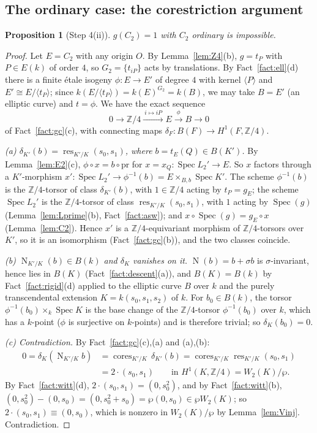 \documentclass[11pt]{amsart}
\newtheorem{proposition}[theorem]{Proposition}
\theoremstyle{definition}
\theoremstyle{remark}
\newcommand{\Z}{\mathbb Z}
\newcommand{\res}{\operatorname{res}}
\newcommand{\cores}{\operatorname{cores}}
\newcommand{\Spec}{\operatorname{Spec}}
\newcommand{\Nm}{\operatorname{N}}
\begin{document}
\subsection{The ordinary case: the corestriction argument}

\begin{proposition}[Step 4(ii)]\label{prop:step4ii}
$g(C_2)=1$ with $C_2$ ordinary is impossible.
\end{proposition}

\begin{proof}
Let $E=C_2$ with any origin $O$. By Lemma~\ref{lem:Z4}(b), $g=t_P$ with $P\in E(k)$ of
order $4$, so $G_2=\{t_{iP}\}$ acts by translations. By Fact~\ref{fact:ell}(d) there is a
finite \'etale isogeny $\phi\colon E\to E'$ of degree $4$ with kernel $\langle P\rangle$
and $E'\cong E/\langle t_P\rangle$; since $k(E/\langle t_P\rangle)=k(E)^{G_2}=k(B)$, we may
take $B=E'$ (an elliptic curve) and $t=\phi$. We have the exact sequence
\[
0\to\Z/4\xrightarrow{\ i\mapsto iP\ }E\xrightarrow{\ \phi\ }B\to0
\]
of Fact~\ref{fact:gc}(c), with connecting maps $\delta_F\colon B(F)\to H^1(F,\Z/4)$.

\emph{(a) $\delta_{K'}(b)=\res_{K'/K}(s_0,s_1)$, where $b=t_E(Q)\in B(K')$.} By
Lemma~\ref{lem:E2}(c), $\phi\circ x=b\circ\mathrm{pr}$ for $x=x_Q\colon\Spec L_2'\to E$.
So $x$ factors through a $K'$-morphism $x'\colon\Spec L_2'\to\phi^{-1}(b)=E\times_{B,b}\Spec K'$.
The scheme $\phi^{-1}(b)$ is the $\Z/4$-torsor of class $\delta_{K'}(b)$, with $1\in\Z/4$
acting by $t_P=g_E$; the scheme $\Spec L_2'$ is the $\Z/4$-torsor of class
$\res_{K'/K}(s_0,s_1)$, with $1$ acting by $\Spec(g)$ (Lemma~\ref{lem:Lprime}(b),
Fact~\ref{fact:asw}); and $x\circ\Spec(g)=g_E\circ x$ (Lemma~\ref{lem:C2}). Hence $x'$ is
a $\Z/4$-equivariant morphism of $\Z/4$-torsors over $K'$, so it is an isomorphism
(Fact~\ref{fact:gc}(b)), and the two classes coincide.

\emph{(b) $\Nm_{K'/K}(b)\in B(k)$ and $\delta_K$ vanishes on it.} $\Nm(b)=b+\sigma b$ is
$\sigma$-invariant, hence lies in $B(K)$ (Fact~\ref{fact:descent}(a)), and $B(K)=B(k)$ by
Fact~\ref{fact:rigid}(d) applied to the elliptic curve $B$ over $k$ and the purely
transcendental extension $K=k(s_0,s_1,s_2)$ of $k$. For $b_0\in B(k)$, the torsor
$\phi^{-1}(b_0)\times_k\Spec K$ is the base change of the $\Z/4$-torsor $\phi^{-1}(b_0)$
over $k$, which has a $k$-point ($\phi$ is surjective on $k$-points) and is therefore
trivial; so $\delta_K(b_0)=0$.

\emph{(c) Contradiction.} By Fact~\ref{fact:gc}(c),(a) and (a),(b):
\begin{align*}
0=\delta_K(\Nm_{K'/K}b)&=\cores_{K'/K}\,\delta_{K'}(b)=\cores_{K'/K}\res_{K'/K}(s_0,s_1)\\
&=2\cdot(s_0,s_1)\qquad\text{in }H^1(K,\Z/4)=W_2(K)/\wp .
\end{align*}
By Fact~\ref{fact:witt}(d), $2\cdot(s_0,s_1)=(0,s_0^2)$, and by Fact~\ref{fact:witt}(b),
$(0,s_0^2)-(0,s_0)=(0,s_0^2+s_0)=\wp(0,s_0)\in\wp W_2(K)$; so $2\cdot(s_0,s_1)\equiv(0,s_0)$,
which is nonzero in $W_2(K)/\wp$ by Lemma~\ref{lem:Vinj}. Contradiction.
\end{proof}
\end{document}
